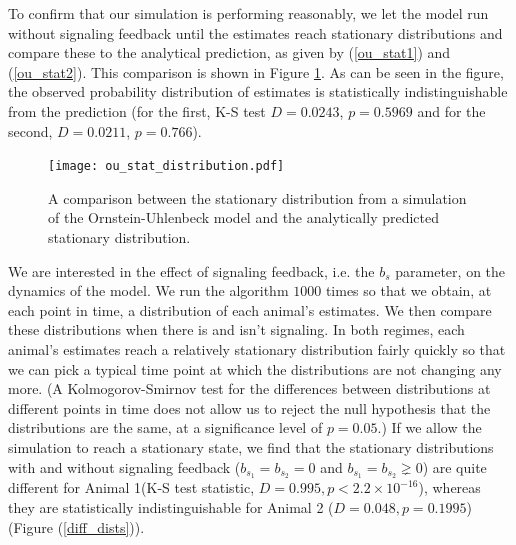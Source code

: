 \documentclass{article}
\begin{document}
To confirm that our simulation is performing reasonably, we let the model run without signaling feedback until the estimates reach stationary distributions and compare these to the analytical prediction, as given by (\ref{ou_stat1}) and (\ref{ou_stat2}).  This comparison is shown in Figure \ref{ou_stat_dist}.  As can be seen in the figure, the observed probability distribution of estimates is statistically indistinguishable from the prediction (for the first, K-S test $D=0.0243$, $p=0.5969$ and for the second, $D=0.0211$, $p=0.766$).

\begin{figure}
\begin{center}
\texttt{[image: ou\_stat\_distribution.pdf]} \end{center}
\caption{\label{ou_stat_dist} A comparison between the stationary distribution from a simulation of the Ornstein-Uhlenbeck model and the analytically predicted stationary distribution.}
\end{figure}

We are interested in the effect of signaling feedback, i.e. the $b_s$ parameter, on the dynamics of the model.  We run the algorithm $1000$ times so that we obtain, at each point in time, a distribution of each animal's estimates.  We then compare these distributions when there is and isn't signaling.  In both regimes, each animal's estimates reach a relatively stationary distribution fairly quickly so that we can pick a typical time point at which the distributions are not changing any more.  (A Kolmogorov-Smirnov test for the differences between distributions at different points in time does not allow us to reject the null hypothesis that the distributions are the same, at a significance level of $p=0.05$.)  If we allow the simulation to reach a stationary state, we find that the stationary distributions with and without signaling feedback ($b_{s_1}=b_{s_2}=0$ and $b_{s_1}=b_{s_2}\gneq 0$) are quite different for Animal 1(K-S test statistic, $D=0.995,p<2.2\times10^{-16}$), whereas they are statistically indistinguishable for Animal 2 ($D=0.048, p=0.1995$) (Figure (\ref{diff_dists})).   
\end{document}
